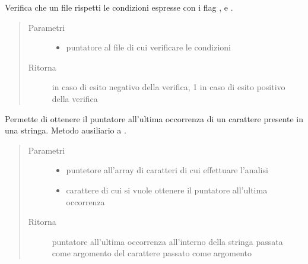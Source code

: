 \documentclass[letterpaper,10pt,italian,openany,oneside]{sphinxmanual}
\begin{document}

\begin{fulllineitems}
\label{\detokenize{code/inputscan:c.checkOptions}}
Verifica che un file rispetti le condizioni espresse con i flag ,  e .
\begin{quote}\begin{description}
\item[{Parametri}] \leavevmode\begin{itemize}
\item {} 
 \textendash{} puntatore al file di cui verificare le condizioni

\end{itemize}

\item[{Ritorna}]  in caso di esito negativo della verifica, 1 in caso di esito positivo della verifica

\end{description}\end{quote}

\end{fulllineitems}


\begin{fulllineitems}
\label{\detokenize{code/inputscan:c.findLastOf}}
Permette di ottenere il puntatore all’ultima occorrenza di un carattere presente in una stringa.
Metodo ausiliario a .
\begin{quote}\begin{description}
\item[{Parametri}] \leavevmode\begin{itemize}
\item {} 
 \textendash{} puntetore all’array di caratteri di cui effettuare l’analisi

\item {} 
 \textendash{} carattere di cui si vuole ottenere il puntatore all’ultima occorrenza

\end{itemize}

\item[{Ritorna}] \leavevmode
puntatore all’ultima occorrenza all’interno della stringa passata come argomento del carattere passato come argomento

\end{description}\end{quote}

\end{fulllineitems}
\end{document}
